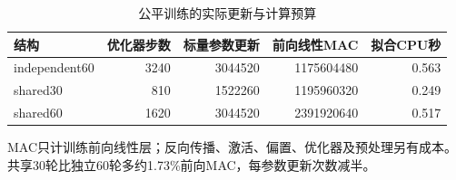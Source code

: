\begin{table}[!htbp]\centering
\caption{公平训练的实际更新与计算预算}\label{tab:round2budget}
\small\setlength{\tabcolsep}{4pt}
\begin{tabularx}{\linewidth}{L r r r r}\toprule
结构 & 优化器步数 & 标量参数更新 & 前向线性MAC & 拟合CPU秒 \\
\midrule
independent60 & 3240 & 3044520 & 1175604480 & 0.563 \\
shared30 & 810 & 1522260 & 1195960320 & 0.249 \\
shared60 & 1620 & 3044520 & 2391920640 & 0.517 \\
\bottomrule\end{tabularx}
\par\vspace{3pt}\begin{minipage}{\linewidth}\footnotesize MAC只计训练前向线性层；反向传播、激活、偏置、优化器及预处理另有成本。共享30轮比独立60轮多约1.73\%前向MAC，每参数更新次数减半。\end{minipage}
\end{table}
